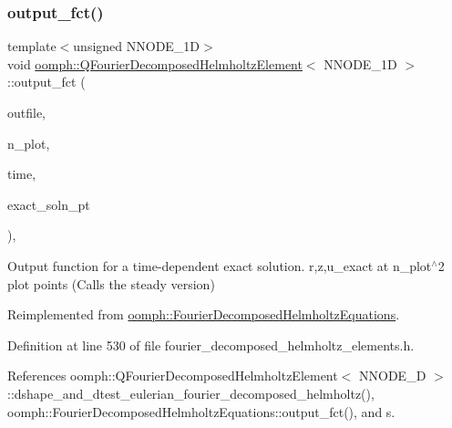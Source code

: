 \subsubsection{\texorpdfstring{output\+\_\+fct()}{output\_fct()}\hspace{0.1cm}{\footnotesize\ttfamily [2/2]}}
{\footnotesize\ttfamily template$<$unsigned N\+N\+O\+D\+E\+\_\+1D$>$ \\
void \hyperlink{classoomph_1_1QFourierDecomposedHelmholtzElement}{oomph\+::\+Q\+Fourier\+Decomposed\+Helmholtz\+Element}$<$ N\+N\+O\+D\+E\+\_\+1D $>$\+::output\+\_\+fct (\begin{DoxyParamCaption}\item[{std\+::ostream \&}]{outfile,  }\item[{const unsigned \&}]{n\+\_\+plot,  }\item[{const double \&}]{time,  }\item[{\hyperlink{classoomph_1_1FiniteElement_ad4ecf2b61b158a4b4d351a60d23c633e}{Finite\+Element\+::\+Unsteady\+Exact\+Solution\+Fct\+Pt}}]{exact\+\_\+soln\+\_\+pt }\end{DoxyParamCaption})\hspace{0.3cm}{\ttfamily [inline]}, {\ttfamily [virtual]}}



Output function for a time-\/dependent exact solution. r,z,u\+\_\+exact at n\+\_\+plot$^\wedge$2 plot points (Calls the steady version) 



Reimplemented from \hyperlink{classoomph_1_1FourierDecomposedHelmholtzEquations_a4a094945d74be0e025895f240d4b0072}{oomph\+::\+Fourier\+Decomposed\+Helmholtz\+Equations}.



Definition at line 530 of file fourier\+\_\+decomposed\+\_\+helmholtz\+\_\+elements.\+h.



References oomph\+::\+Q\+Fourier\+Decomposed\+Helmholtz\+Element$<$ N\+N\+O\+D\+E\+\_\+D $>$\+::dshape\+\_\+and\+\_\+dtest\+\_\+eulerian\+\_\+fourier\+\_\+decomposed\+\_\+helmholtz(), oomph\+::\+Fourier\+Decomposed\+Helmholtz\+Equations\+::output\+\_\+fct(), and s.

\mbox{\label{classoomph_1_1QFourierDecomposedHelmholtzElement_a0feea9801280dce3e0a73bd5d370431f}} 
